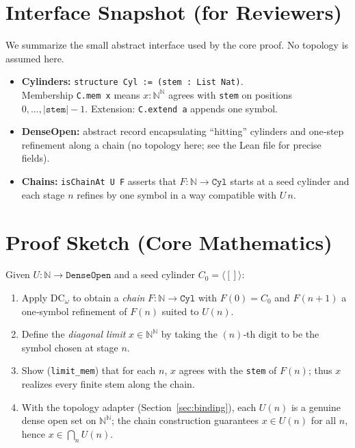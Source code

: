 \documentclass[11pt]{article}
\newcommand{\NN}{\mathbb{N}}
\newcommand{\Seq}{\NN^{\NN}}  %
\newcommand{\DCw}{\mathrm{DC}_\omega}
\theoremstyle{definition}
\theoremstyle{plain}
\begin{document}
\section{Interface Snapshot (for Reviewers)}
\label{sec:interface}
We summarize the small abstract interface used by the core proof.
No topology is assumed here.
\begin{itemize}[leftmargin=1.5em]
  \item \textbf{Cylinders:} \texttt{structure Cyl := (stem : List Nat)}.\\
  Membership \texttt{C.mem x} means $x:\Seq$ agrees with \texttt{stem}
  on positions $0,\dots,\lvert\texttt{stem}\rvert-1$.
  Extension: \texttt{C.extend a} appends one symbol.

  \item \textbf{DenseOpen:} abstract record encapsulating ``hitting'' cylinders
  and one‑step refinement along a chain (no topology here; see the Lean file
  for precise fields).

  \item \textbf{Chains:} \texttt{isChainAt U F} asserts that $F:\NN\to\texttt{Cyl}$
  starts at a seed cylinder and each stage $n$ refines by one symbol in a way
  compatible with $U\,n$.
\end{itemize}

\section{Proof Sketch (Core Mathematics)}
\label{sec:sketch}
Given $U:\NN\to\texttt{DenseOpen}$ and a seed cylinder $C_0=\langle[]\rangle$:
\begin{enumerate}[leftmargin=1.5em]
  \item Apply $\DCw$ to obtain a \emph{chain} $F:\NN\to\texttt{Cyl}$ with
    $F(0)=C_0$ and $F(n+1)$ a one‑symbol refinement of $F(n)$ suited to $U(n)$.
  \item Define the \emph{diagonal limit} $x\in\Seq$ by taking the $(n)$‑th digit
    to be the symbol chosen at stage $n$.
  \item Show (\texttt{limit\_mem}) that for each $n$, $x$ agrees with the
    \texttt{stem} of $F(n)$; thus $x$ realizes every finite stem along the chain.
  \item With the topology adapter (Section~\ref{sec:binding}), each $U(n)$ is a genuine
    dense open set on $\Seq$; the chain construction guarantees $x\in U(n)$ for all $n$,
    hence $x\in\bigcap_n U(n)$.
\end{enumerate}
\end{document}
